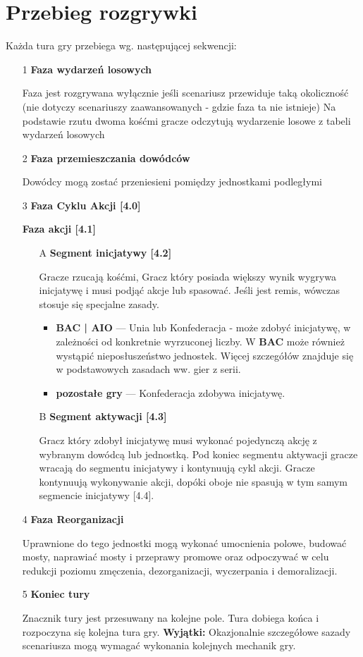 \section{Przebieg rozgrywki}
Każda tura gry przebiega wg. następującej sekwencji:
\begin{itemize}
    \item[1] \textbf{Faza wydarzeń losowych}\par
    Faza jest rozgrywana wyłącznie jeśli scenariusz przewiduje taką okoliczność (nie dotyczy scenariuszy zaawansowanych - gdzie faza ta nie istnieje)
    Na podstawie rzutu dwoma kośćmi gracze odczytują wydarzenie losowe z tabeli wydarzeń losowych
    \item[2] \textbf{Faza przemieszczania dowódców}\par
    Dowódcy mogą zostać przeniesieni pomiędzy jednostkami podległymi
    \item[3] \textbf{Faza Cyklu Akcji [4.0]}\par
    \textbf{Faza akcji [4.1]} \par
    \begin{itemize}
        \item[A] \textbf{Segment inicjatywy [4.2]}\par
        Gracze rzucają kośćmi, Gracz który posiada większy wynik wygrywa inicjatywę i musi podjąć akcje lub spasować.
        Jeśli jest remis, wówczas stosuje się specjalne zasady.
        \begin{itemize}
            \item \textbf{BAC | AIO} ---
            Unia lub Konfederacja - może zdobyć inicjatywę, w zależności od konkretnie wyrzuconej liczby.
            W \textbf{BAC} może również wystąpić nieposłuszeństwo jednostek.
            Więcej szczegółów znajduje się w podstawowych zasadach ww. gier z serii.
            \item \textbf{pozostałe gry} --- Konfederacja zdobywa inicjatywę.
        \end{itemize}
        \item[B] \textbf{Segment aktywacji [4.3]} \par
        Gracz który zdobył inicjatywę musi wykonać pojedynczą akcję z wybranym dowódcą lub jednostką.
        Pod koniec segmentu aktywacji gracze wracają do segmentu inicjatywy i kontynuują cykl akcji.
        Gracze kontynuują wykonywanie akcji, dopóki oboje nie spasują w tym samym segmencie inicjatywy [4.4].

    \end{itemize}
    \item[4] \textbf{Faza Reorganizacji}\par
    Uprawnione do tego jednostki mogą wykonać umocnienia polowe, budować mosty, naprawiać mosty i przeprawy promowe
    oraz odpoczywać w celu redukcji poziomu zmęczenia, dezorganizacji, wyczerpania i demoralizacji.
    \item[5] \textbf{Koniec tury}\par Znacznik tury jest przesuwany na kolejne pole. Tura dobiega końca i rozpoczyna się kolejna tura gry.
    \textbf{Wyjątki:} Okazjonalnie szczegółowe sazady scenariusza mogą wymagać wykonania kolejnych mechanik gry.
\end{itemize}